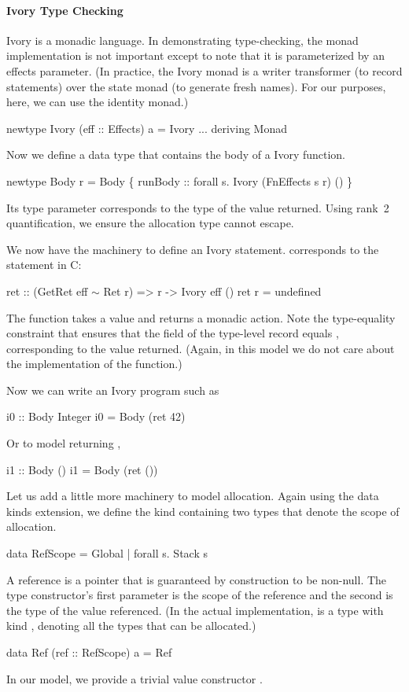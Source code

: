 \paragraph{Ivory Type Checking}
Ivory is a monadic language.  In demonstrating type-checking, the monad
implementation is not important except to note that it is parameterized by an
effects parameter.  (In practice, the Ivory monad is a writer transformer (to
record statements) over the state monad (to generate fresh names).  For our
purposes, here, we can use the identity monad.)
\begin{code}
newtype Ivory (eff :: Effects) a = Ivory ...
  deriving Monad
\end{code}
\noindent
Now we define a data type  that contains the body of a Ivory
function.
\begin{code}
newtype Body r = Body
  \{ runBody :: forall s. Ivory (FnEffects s r) () \}
\end{code}
\noindent
Its type parameter corresponds to the type of the value returned.  Using rank~2
quantification, we ensure the allocation type cannot escape.

We now have the machinery to define an Ivory statement.   corresponds to
the  statement in C:
\begin{code}
ret :: (GetRet eff \(\sim\) Ret r) => r -> Ivory eff ()
ret r = undefined
\end{code}
\noindent
The function  takes a value and returns a monadic action.  Note the
type-equality constraint that ensures that the  field of the type-level
record equals , corresponding to the value returned.  (Again, in this
model we do not care about the implementation of the function.)

Now we can write an Ivory program such as
\begin{code}
i0 :: Body Integer
i0 = Body (ret 42)
\end{code}
\noindent
Or to model returning ,
\begin{code}
i1 :: Body ()
i1 = Body (ret ())
\end{code}

Let us add a little more machinery to model allocation.  Again using the data
kinds extension, we define the kind  containing two types that
denote the scope of allocation.
\begin{code}
data RefScope = Global | forall s. Stack s
\end{code}
\noindent
A reference is a pointer that is guaranteed by construction to be non-null.  The
type constructor's first parameter is the scope of the reference and the second
is the type of the value referenced.  (In the actual implementation,  is a
type with kind , denoting all the types that can be allocated.)
\begin{code}
data Ref (ref :: RefScope) a = Ref
\end{code}
\noindent
In our model, we provide a trivial value constructor .


